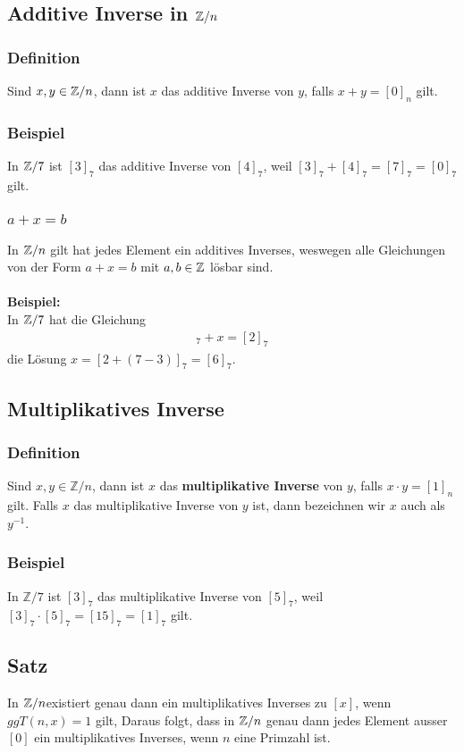 \subsection{Additive Inverse in $\mathbb{Z}/n$}
\subsubsection{Definition}
Sind $x,y \in \mathbb{Z}/n$, dann ist $x$ das additive Inverse von $y$, falls $x + y = [0]_n$ gilt.
\subsubsection{Beispiel}
In $\mathbb{Z}/7$ ist $[3]_7$ das additive Inverse von $[4]_7$, weil $[3]_7 + [4]_7 = [7]_7 = [0]_7$ gilt.
\subsubsection{$a + x = b$}
In $\mathbb{Z}/n$ gilt hat jedes Element ein additives Inverses, weswegen alle
Gleichungen von der Form $a + x = b$ mit $a,b \in \mathbb{Z}$ lösbar sind.\\\\
\textbf{Beispiel:}\\
In $\mathbb{Z}/7$ hat die Gleichung
\begin{align*}
	[3]_7 + x = [2]_7
\end{align*}
die Lösung $x = [2 + (7 - 3)]_7 = [6]_7$.
\subsection{Multiplikatives Inverse}
\subsubsection{Definition}
Sind $x, y \in \mathbb{Z}/n$, dann ist $x$ das \textbf{multiplikative Inverse}
von $y$, falls $x \cdot y = [1]_n$ gilt. Falls $x$ das multiplikative Inverse von $y$ ist, dann bezeichnen
wir $x$ auch als $y^{-1}$.

\subsubsection{Beispiel}
In $\mathbb{Z}/7$ ist $[3]_7$ das multiplikative Inverse von $[5]_7$,
weil $[3]_7 \cdot [5]_7 = [15]_7 = [1]_7$ gilt.
\subsection{Satz}
In $\mathbb{Z}/n$existiert genau dann ein multiplikatives Inverses zu $[x]$, wenn $ggT(n,x) = 1$ gilt,
Daraus folgt, dass in $\mathbb{Z}/n$ genau dann jedes Element ausser $[0]$ ein multiplikatives
Inverses, wenn $n$ eine Primzahl ist.

